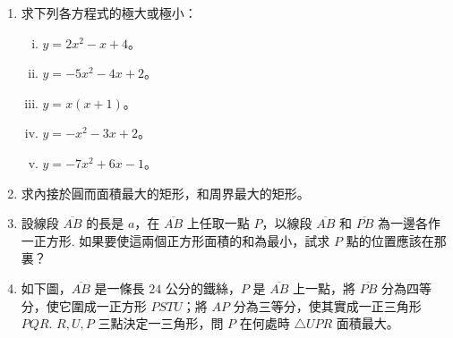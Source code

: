 \begin{enumerate}
  \item 求下列各方程式的極大或極小：
  \begin{enumerate}[(i)]
    \item $y = 2x^2-x+4$。
    \item $y = -5x^2-4x+2$。
    \item $y = x(x+1)$。
    \item $y = -x^2-3x+2$。
    \item $y = -7x^2+6x-1$。
  \end{enumerate}

  \item 求內接於圓而面積最大的矩形，和周界最大的矩形。

  \item 設線段 $\overline{AB}$ 的長是 $a$，在 $\overline{AB}$ 上任取一點 $P$，以線段 $\overline{AB}$ 和 $\overline{PB}$ 為一邊各作一正方形\label{note:b2-ch1-ex1-4-q3}. 如果要使這兩個正方形面積的和為最小，試求 $P$ 點的位置應該在那裏？

  \item 如下圖，$\overline{AB}$ 是一條長 $24$ 公分的鐵絲，$P$ 是 $\overline{AB}$ 上一點，將 $\overline{PB}$ 分為四等分，使它圍成一正方形 $PSTU$；將 $AP$ 分為三等分，使其實成一正三角形 $PQR$\label{note:b2-ch1-ex1-4-q4}. $R, U, P$ 三點決定一三角形，問 $P$ 在何處時 $\triangle UPR$ 面積最大。

  \begin{figure}[htbp]
  \centering
\end{figure}
\end{enumerate}
